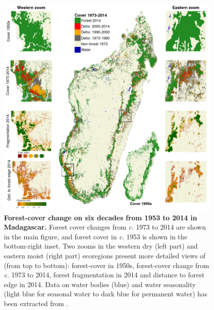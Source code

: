 \documentclass[a4paper, 12pt, leqno]{article} %
\begin{document}
\begin{figure}[h!]
  \centering
  
  \includegraphics[width=\textwidth]{figs/fig_fcc.png}

  \caption{\textbf{Forest-cover change on six decades from 1953 to
      2014 in Madagascar.} Forest cover changes from \emph{c.} 1973 to
    2014 are shown in the main figure, and forest cover in \emph{c.}
    1953 is shown in the bottom-right inset. Two zooms in the western
    dry (left part) and eastern moist (right part) ecoregions present
    more detailed views of (from top to bottom): forest-cover in
    1950s, forest-cover change from \emph{c.} 1973 to 2014, forest
    fragmentation in 2014 and distance to forest edge in 2014. Data on
    water bodies (blue) and water seasonality (light blue for seasonal
    water to dark blue for permanent water) has been extracted from
    \citet{Pekel2016}.}

  \label{fig:fcc}

\end{figure}

\newpage
\end{document}
